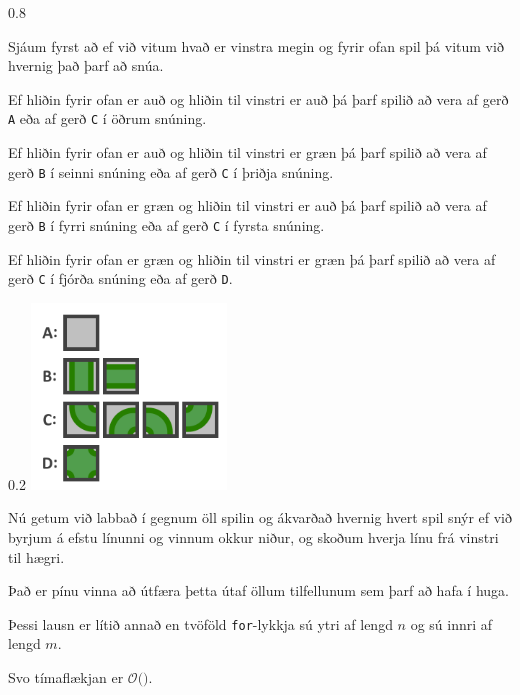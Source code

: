 {
	{
		{
			{0.8\textwidth}
			{
				\item<1-> Sjáum fyrst að ef við vitum hvað er vinstra megin og fyrir ofan spil þá vitum við hvernig það þarf að snúa.
				\item<2-> Ef hliðin fyrir ofan er auð og hliðin til vinstri er auð þá þarf spilið að vera af gerð \texttt{A}
							eða af gerð \texttt{C} í öðrum snúning.
				\item<3-> Ef hliðin fyrir ofan er auð og hliðin til vinstri er græn þá þarf spilið að vera af gerð \texttt{B} í seinni snúning
							eða af gerð \texttt{C} í þriðja snúning.
				\item<4-> Ef hliðin fyrir ofan er græn og hliðin til vinstri er auð þá þarf spilið að vera af gerð \texttt{B} í fyrri snúning
							eða af gerð \texttt{C} í fyrsta snúning.
				\item<5-> Ef hliðin fyrir ofan er græn og hliðin til vinstri er græn þá þarf spilið að vera af gerð \texttt{C} í fjórða snúning
							eða af gerð \texttt{D}.
			}
		}
		{
			{0.2\textwidth}
			\includegraphics[scale = 0.3]{fig/pr1}
		}
	}
}

{
	{
		\item<1-> Nú getum við labbað í gegnum öll spilin og ákvarðað hvernig hvert spil snýr ef við byrjum á efstu línunni og vinnum okkur niður,
					og skoðum hverja línu frá vinstri til hægri.
		\item<2-> Það er pínu vinna að útfæra þetta útaf öllum tilfellunum sem þarf að hafa í huga.
	}
}

{
}

{
}

{
	{
		\item<1-> Þessi lausn er lítið annað en tvöföld \texttt{for}-lykkja sú ytri af lengd $n$ og sú innri af lengd $m$.
		\item<2-> Svo tímaflækjan er $\mathcal{O}($\onslide<3->{$n \cdot m$}$)$.
	}
}

{
}


